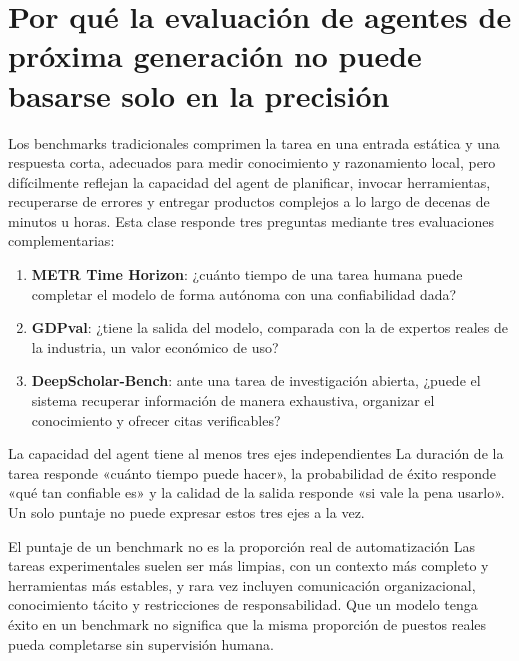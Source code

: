 \section{Por qué la evaluación de agentes de próxima generación no puede basarse solo en la precisión}

Los benchmarks tradicionales comprimen la tarea en una entrada estática y una respuesta corta, adecuados para medir conocimiento y razonamiento local, pero difícilmente reflejan la capacidad del agent de planificar, invocar herramientas, recuperarse de errores y entregar productos complejos a lo largo de decenas de minutos u horas. Esta clase responde tres preguntas mediante tres evaluaciones complementarias:

\begin{enumerate}
    \item \textbf{METR Time Horizon}: ¿cuánto tiempo de una tarea humana puede completar el modelo de forma autónoma con una confiabilidad dada?
    \item \textbf{GDPval}: ¿tiene la salida del modelo, comparada con la de expertos reales de la industria, un valor económico de uso?
    \item \textbf{DeepScholar-Bench}: ante una tarea de investigación abierta, ¿puede el sistema recuperar información de manera exhaustiva, organizar el conocimiento y ofrecer citas verificables?
\end{enumerate}


\begin{importantbox}{La capacidad del agent tiene al menos tres ejes independientes}
La duración de la tarea responde «cuánto tiempo puede hacer», la probabilidad de éxito responde «qué tan confiable es» y la calidad de la salida responde «si vale la pena usarlo». Un solo puntaje no puede expresar estos tres ejes a la vez.
\end{importantbox}

\begin{warningbox}{El puntaje de un benchmark no es la proporción real de automatización}
Las tareas experimentales suelen ser más limpias, con un contexto más completo y herramientas más estables, y rara vez incluyen comunicación organizacional, conocimiento tácito y restricciones de responsabilidad. Que un modelo tenga éxito en un benchmark no significa que la misma proporción de puestos reales pueda completarse sin supervisión humana.
\end{warningbox}

